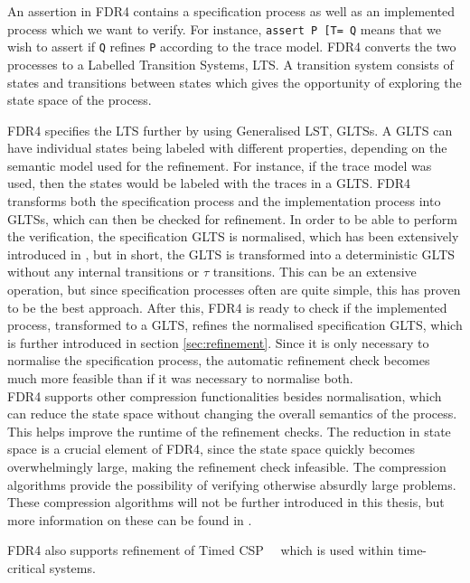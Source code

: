 An assertion in FDR4 contains a specification process as well as an implemented process which we want to verify. For instance, \texttt{assert P [T= Q} means that we wish to assert if \texttt{Q} refines \texttt{P} according to the trace model.
FDR4 converts the two processes to a Labelled Transition Systems, LTS. A transition system consists of states and transitions between states which gives the opportunity of exploring the state space of the process.

FDR4 specifies the LTS further by using Generalised LST, GLTSs. A GLTS can have individual states being labeled with different properties, depending on the semantic model used for the refinement. For instance, if the trace model was used, then the states would be labeled with the traces in a GLTS.
FDR4 transforms both the specification process and the implementation process into GLTSs, which can then be checked for refinement. In order to be able to perform the verification, the specification GLTS is normalised, which has been extensively introduced in \cite{Roscoe1997}, but in short, the GLTS is transformed into a deterministic GLTS without any internal transitions or $\tau$ transitions. This can be an extensive operation, but since specification processes often are quite simple, this has proven to be the best approach.
After this, FDR4 is ready to check if the implemented process, transformed to a GLTS, refines the normalised specification GLTS, which is further introduced in section \ref{sec:refinement}. Since it is only necessary to normalise the specification process, the automatic refinement check becomes much more feasible than if it was necessary to normalise both. \\

FDR4 supports other compression functionalities besides normalisation, which can reduce the state space without changing the overall semantics of the process. This helps improve the runtime of the refinement checks. The reduction in state space is a crucial element of FDR4, since the state space quickly becomes overwhelmingly large, making the refinement check infeasible. The compression algorithms provide the possibility of verifying otherwise absurdly large problems.
These compression algorithms will not be further introduced in this thesis, but more information on these can be found in \cite{Roscoe2010}.

FDR4 also supports refinement of Timed CSP~\cite{REED1988249}~\cite{Armstrong2011} which is used within time-critical systems. \\

